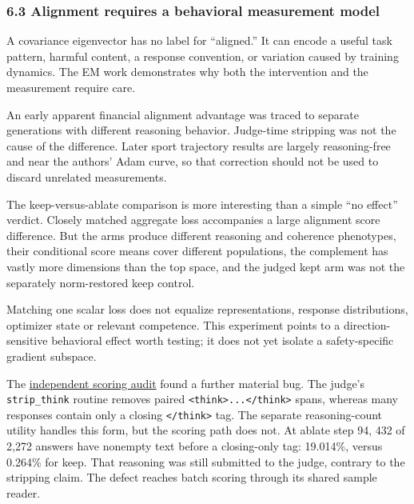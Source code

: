 \documentclass[
  british,
  10pt,
  a4paper,
]{article}
\newcounter{none} %
\begin{document}
\subsubsection{6.3 Alignment requires a behavioral measurement
model}\label{synthesis--alignment-requires-a-behavioral-measurement-model}

A covariance eigenvector has no label for ``aligned.'' It can encode a
useful task pattern, harmful content, a response
convention,\allowbreak{} or variation caused by training dynamics. The
EM work demonstrates why both the intervention and the measurement
require care.

An early apparent financial alignment advantage was traced to separate
generations with different reasoning behavior. Judge-time stripping was
not the cause of the difference.\allowbreak{} Later sport trajectory
results are largely reasoning-\allowbreak{}free and near the authors'
Adam curve, so that correction should not be used to discard unrelated
measurements\allowbreak{}.\allowbreak{}

The keep-\allowbreak{}versus-\allowbreak{}ablate comparison is more
interesting than a simple ``no effect'' verdict. Closely matched
aggregate loss accompanies a large alignment score
difference.\allowbreak{} But the arms produce different reasoning and
coherence phenotypes,\allowbreak{} their conditional score means cover
different populations,\allowbreak{} the complement has vastly more
dimensions than the top space, and the judged kept arm was not the
separately norm-\allowbreak{}restored keep control.

Matching one scalar loss does not equalize
representati\allowbreak{}ons,\allowbreak{} response
distribution\allowbreak{}s,\allowbreak{} optimizer state or relevant
competence.\allowbreak{} This experiment points to a
direction-\allowbreak{}sensitive behavioral effect worth testing; it
does not yet isolate a safety-\allowbreak{}specific gradient subspace.

The \hyperref[em-results-audit]{independent scoring audit} found a
further material bug. The judge's \texttt{strip\_\allowbreak{}think}
routine removes paired
\texttt{<think>.\allowbreak{}.\allowbreak{}.\allowbreak{}</\allowbreak{}think>}
spans, whereas many responses contain only a closing
\texttt{\textless{}/think\textgreater{}} tag. The separate
reasoning-\allowbreak{}count utility handles this form, but the scoring
path does not. At ablate step 94, 432 of 2,272 answers have nonempty
text before a closing-\allowbreak{}only tag: 19.014\%, versus 0.264\%
for keep. That reasoning was still submitted to the judge, contrary to
the stripping claim. The defect reaches batch scoring through its shared
sample reader.
\end{document}
